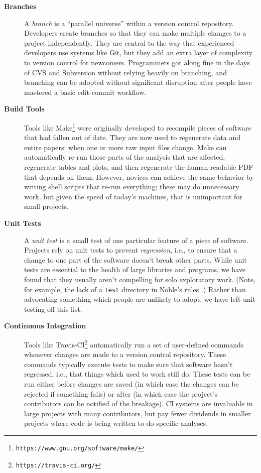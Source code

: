 \documentclass[10pt]{article}
\newcommand{\withurl}[2]{{#1}\footnote{\texttt{#2}}}
\begin{document}
\begin{description}

\item[\textbf{Branches}] A \emph{branch} is a ``parallel universe''
  within a version control repository. Developers create branches so
  that they can make multiple changes to a project independently. They
  are central to the way that experienced developers use systems like
  Git, but they add an extra layer of complexity to version control
  for newcomers.  Programmers got along fine in the days of CVS and
  Subversion without relying heavily on branching, and branching can
  be adopted without significant disruption after people have mastered
  a basic edit-commit workflow.

\item[\textbf{Build Tools}] Tools like
  \withurl{Make}{https://www.gnu.org/software/make/} were originally
  developed to recompile pieces of software that had fallen out of
  date. They are now used to regenerate data and entire papers: when
  one or more raw input files change, Make can automatically re-run
  those parts of the analysis that are affected, regenerate tables and
  plots, and then regenerate the human-readable PDF that depends on
  them.  However, novices can achieve the same behavior by writing
  shell scripts that re-run everything; these may do unnecessary work,
  but given the speed of today's machines, that is unimportant for
  small projects.

\item[\textbf{Unit Tests}] A \emph{unit test} is a small test of one
  particular feature of a piece of software. Projects rely on unit
  tests to prevent \emph{regression}, i.e., to ensure that a change to
  one part of the software doesn't break other parts. While unit tests
  are essential to the health of large libraries and programs, we have
  found that they usually aren't compelling for solo exploratory
  work. (Note, for example, the lack of a \texttt{test} directory in
  Noble's rules \cite{noble2009}.)  Rather than advocating something
  which people are unlikely to adopt, we have left unit testing off
  this list.

\item[\textbf{Continuous Integration}] Tools like
  \withurl{Travis-CI}{https://travis-ci.org/} automatically run a set
  of user-defined commands whenever changes are made to a version
  control repository. These commands typically execute tests to make
  sure that software hasn't regressed, i.e., that things which used to
  work still do. These tests can be run either before changes are
  saved (in which case the changes can be rejected if something fails)
  or after (in which case the project's contributors can be notified
  of the breakage). CI systems are invaluable in large projects with
  many contributors, but pay fewer dividends in smaller projects where
  code is being written to do specific analyses.


\end{description}
\end{document}
